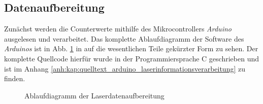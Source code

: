 \subsection{Datenaufbereitung}\label{subsec:datenaufbereitung}
Zunächst werden die Counterwerte mithilfe des Mikrocontrollers \textit{Arduino}
ausgelesen und verarbeitet. Das komplette Ablaufdiagramm der Software des
\textit{Arduinos} ist in Abb. \ref{fig:ablaufdiagramm_arduino_laser} in auf die
wesentlichen Teile gekürzter Form zu sehen. Der komplette Quellcode hierfür
wurde in der Programmiersprache C geschrieben und ist im Anhang
\ref{anh:kap:quelltext_arduino_laserinformationsverarbeitung} zu finden.
\begin{figure}[hp]
 	\centering
	\caption[Laserdatenaufbereitung -
	Ablaufdiagramm]{Ablaufdiagramm der
	Laserdatenaufbereitung}\label{fig:ablaufdiagramm_arduino_laser}
\end{figure}
